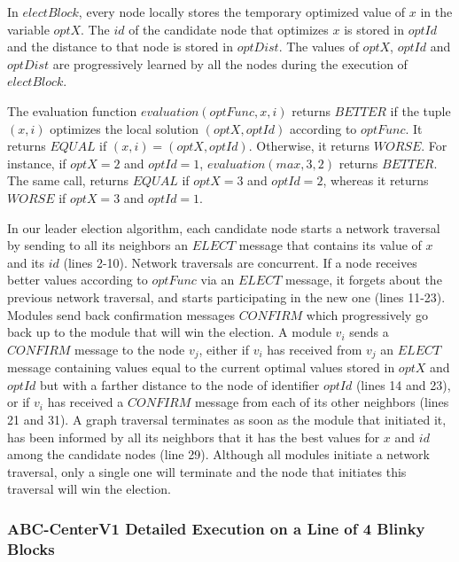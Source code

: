 In $electBlock$, every node locally stores the temporary optimized value of $x$ in the variable $optX$. The $id$ of the candidate node that optimizes $x$ is stored in $optId$ and the distance to that node is stored in $optDist$. The values of $optX$, $optId$ and $optDist$ are progressively learned by all the nodes during the execution of $electBlock$.

The evaluation function $evaluation(optFunc,x,i)$ returns $\mathit{BETTER}$ if the tuple $(x,i)$ optimizes the local solution $(optX,optId)$ according to $optFunc$. It returns $\mathit{EQUAL}$ if $(x,i) = (optX,optId)$. Otherwise, it returns $\mathit{WORSE}$. For instance, if $optX = 2$ and $optId = 1$, $evaluation(max,3,2)$ returns $\mathit{BETTER}$. The same call, returns $\mathit{EQUAL}$ if $optX = 3$ and $optId = 2$, whereas it returns $\mathit{WORSE}$ if $optX = 3$ and $optId = 1$.

In our leader election algorithm, each candidate node starts a network traversal by sending to all its neighbors an $\mathit{ELECT}$ message that contains its value of $x$ and its $id$ (lines 2-10). Network traversals are concurrent. If a node receives better values according to $optFunc$ via an $\mathit{ELECT}$ message, it forgets about the previous network traversal, and starts participating in the new one (lines 11-23). Modules send back confirmation messages $\mathit{CONFIRM}$ which progressively go back up to the module that will win the election. A module $v_i$ sends a $\mathit{CONFIRM}$ message to the node $v_j$, either if $v_i$ has received from $v_j$ an $\mathit{ELECT}$ message containing values equal to the current optimal values stored in $optX$ and $optId$ but with a farther distance to the node of identifier $optId$ (lines 14 and 23), or if $v_i$ has received a $\mathit{CONFIRM}$ message from each of its other neighbors (lines 21 and 31). A graph traversal terminates as soon as the module that initiated it, has been informed by all its neighbors that it has the best values for $x$ and $id$ among the candidate nodes (line 29). Although all modules initiate a network traversal, only a single one will terminate and the node that initiates this traversal will win the election. 

\subsubsection{ABC-CenterV1 Detailed Execution on a Line of 4 Blinky Blocks}


